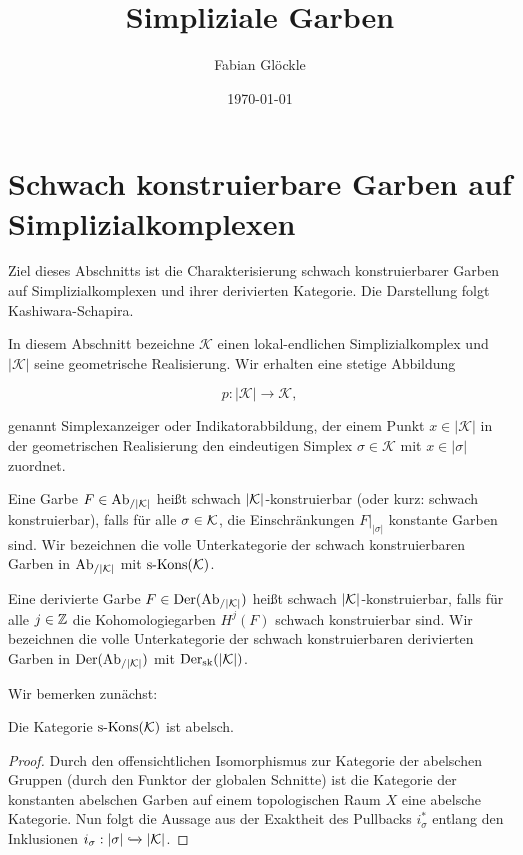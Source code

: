 



\title{Simpliziale Garben}
\author{Fabian Glöckle}
\date{\today}

\section{Schwach konstruierbare Garben auf Simplizialkomplexen}

Ziel dieses Abschnitts ist die Charakterisierung schwach
konstruierbarer Garben auf Simplizialkomplexen und ihrer derivierten
Kategorie. Die Darstellung folgt Kashiwara-Schapira.

In diesem Abschnitt bezeichne $\mathcal{K}$ einen lokal-endlichen
Simplizialkomplex und $|\mathcal{K}|$ seine geometrische
Realisierung. Wir erhalten eine stetige Abbildung

\[ p: |\mathcal{K}| \to \mathcal{K}, \]

genannt Simplexanzeiger oder Indikatorabbildung, der einem Punkt $x
\in |\mathcal{K}|$ in der geometrischen Realisierung den eindeutigen
Simplex $\sigma \in \mathcal{K}$ mit $x \in |\sigma|$ zuordnet.


\begin{defn}
  Eine Garbe $F \in \operatorname{Ab}_{/|\mathcal{K}|}$ heißt schwach $|\mathcal{K}|$-konstruierbar (oder
  kurz: schwach konstruierbar), falls für alle $\sigma \in \mathcal{K}$, die
  Einschränkungen $F|_{|\sigma|}$ konstante Garben sind. Wir
  bezeichnen die volle Unterkategorie der schwach konstruierbaren
  Garben in $\operatorname{Ab}_{/|\mathcal{K}|}$ mit $\operatorname{s-Kons}(\mathcal{K})$.

  Eine derivierte Garbe $F \in \operatorname{Der}(\operatorname{Ab}_{/|\mathcal{K}|})$ heißt schwach
  $|\mathcal{K}|$-konstruierbar, falls für alle $j \in \mathbb{Z}$ die
  Kohomologiegarben $H^j(F)$ schwach konstruierbar sind. Wir
  bezeichnen die volle Unterkategorie der schwach konstruierbaren
  derivierten Garben in $\operatorname{Der}(\operatorname{Ab}_{/|\mathcal{K}|})$ mit $\operatorname{Der}_{\mathrm{sk}}(|\mathcal{K}|)$.
\end{defn}

Wir bemerken zunächst:

\begin{lemma}
  Die Kategorie $\operatorname{s-Kons}(\mathcal{K})$ ist abelsch.
\end{lemma}
\begin{proof}
  Durch den offensichtlichen Isomorphismus zur Kategorie der abelschen
  Gruppen (durch den Funktor der globalen Schnitte) ist die Kategorie
  der konstanten abelschen Garben auf einem topologischen Raum $X$
  eine abelsche Kategorie. Nun folgt die Aussage aus der Exaktheit des
  Pullbacks $i_{\sigma}^*$ entlang den Inklusionen $i_{\sigma}:
  |\sigma| \xhookrightarrow{} |\mathcal{K}|$.
\end{proof}

